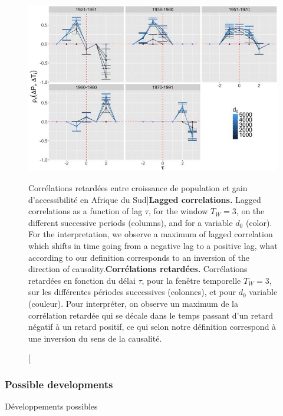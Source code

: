 \begin{figure}
\includegraphics[width=\linewidth]{Figures/Final/4-2-3-fig-causalityregimes-sudafcorrs.jpg}
\caption[Lagged correlations between population growth and accessibility gain in South Africa][Corrélations retardées entre croissance de population et gain d'accessibilité en Afrique du Sud]{\textbf{Lagged correlations.} Lagged correlations as a function of lag $\tau$, for the window $T_W = 3$, on the different successive periods (columns), and for a variable $d_0$ (color). For the interpretation, we observe a maximum of lagged correlation which shifts in time going from a negative lag to a positive lag, what according to our definition corresponds to an inversion of the direction of causality.\label{fig:causalityregimes:sudafcorrs}}{\textbf{Corrélations retardées.}  Corrélations retardées en fonction du délai $\tau$, pour la fenêtre temporelle $T_W=3$, sur les différentes périodes successives (colonnes), et pour $d_0$ variable (couleur). Pour interpréter, on observe un maximum de la corrélation retardée qui se décale dans le temps passant d'un retard négatif à un retard positif, ce qui selon notre définition correspond à une inversion du sens de la causalité.\label{fig:causalityregimes:sudafcorrs}}
\end{figure}



\subsubsection{Possible developments}{Développements possibles}

